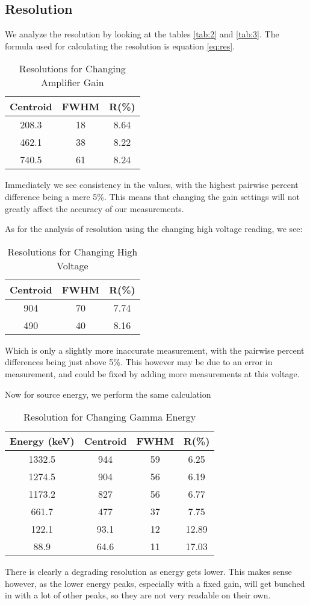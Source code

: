 \documentclass[letterpaper,12pt]{article}
\begin{document}
\subsection{Resolution}
We analyze the resolution by looking at the tables \ref{tab:2} and \ref{tab:3}. The formula used for calculating the resolution is equation \eqref{eq:res}.
\begin{table}[H]
  \centering
  \begin{tabular}{c|c|c}
    Centroid&FWHM&R(\%)\\\hline
    208.3 & 18 & 8.64\\
    462.1 & 38 & 8.22\\
    740.5 & 61 & 8.24
  \end{tabular}
  \caption{Resolutions for Changing Amplifier Gain}
  \label{tab:7}
\end{table}
Immediately we see consistency in the values, with the highest pairwise percent difference being a mere 5\%. This means that changing the gain settings will not greatly affect the accuracy of our measurements.

As for the analysis of resolution using the changing high voltage reading, we see:
\begin{table}[H]
  \centering
  \begin{tabular}{c|c|c}
    Centroid&FWHM&R(\%)\\\hline
    904 & 70 & 7.74 \\
    490 & 40 & 8.16
  \end{tabular}
  \caption{Resolutions for Changing High Voltage}
  \label{tab:8}
\end{table}
Which is only a slightly more inaccurate measurement, with the pairwise percent differences being just above 5\%. This however may be due to an error in measurement, and could be fixed by adding more measurements at this voltage.

Now for source energy, we perform the same calculation
\begin{table}[H]
  \centering
  \begin{tabular}{c|c|c|c}
    Energy (\si{\keV})& Centroid&FWHM&R(\%)\\\hline
    1332.5&944&59&6.25\\
    1274.5&904&56&6.19\\
    1173.2&827&56&6.77\\
    661.7 &477&37&7.75\\
    122.1 &93.1&12&12.89\\
    88.9&64.6&11&17.03
  \end{tabular}
  \caption{Resolution for Changing Gamma Energy}
  \label{tab:9}
\end{table}
There is clearly a degrading resolution as energy gets lower. This makes sense however, as the lower energy peaks, especially with a fixed gain, will get bunched in with a lot of other peaks, so they are not very readable on their own. 
\end{document}
